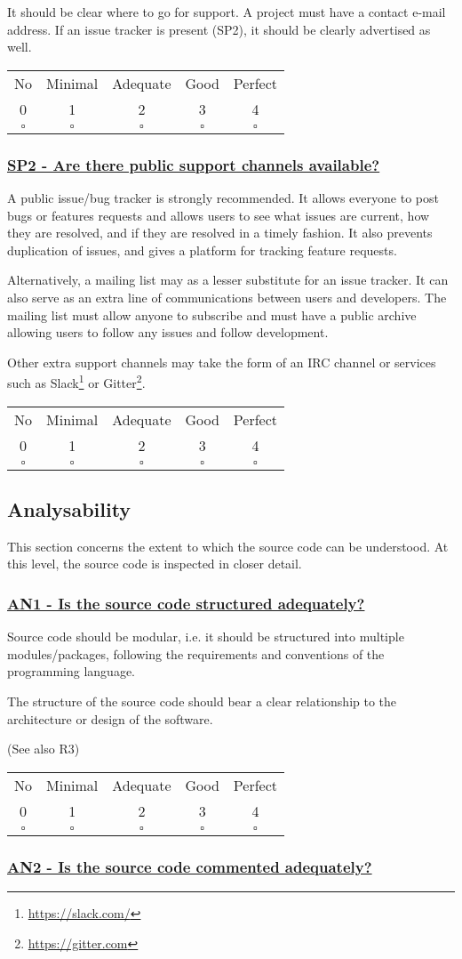 \documentclass[a4paper,11pt]{article}
\newcommand{\criterion}[2]{\subsubsection*{\underline{#1 - #2}}\label{id:#1}}
\newcommand\CheckTable{%
  \begin{tabular}{ccccc}
    No & Minimal & Adequate & Good & Perfect \\
    0 & 1 & 2 & 3 & 4 \\
    \hline
    $\square$ & $\square$ & $\square$ & $\square$ & $\square$ \\
  \end{tabular}%
}
\begin{document}
It should be clear where to go for support. A project must have a contact
e-mail address. If an issue tracker is present (SP2), it should be clearly advertised
as well.

\CheckTable

\newcommand{\spTwoID}{SP2}
\newcommand{\spTwoText}{Are there public support channels available?}
\criterion{\spTwoID}{\spTwoText}

A public issue/bug tracker is strongly recommended. It allows everyone to post
bugs or features requests and allows users to see what issues are current, how
they are resolved, and if they are resolved in a timely fashion. It also
prevents duplication of issues, and gives a platform for
tracking feature requests.

Alternatively, a mailing list may as a lesser substitute for an issue tracker.
It can also serve as an extra line of communications between users
and developers. The mailing list must allow anyone to subscribe and must have a
public archive allowing users to follow any issues and follow development.

Other extra support channels may take the form of an IRC channel or services
such as Slack\footnote{\url{https://slack.com/}} or
Gitter\footnote{\url{https://gitter.com}}.

\CheckTable

\subsection{Analysability}\label{sec:ana}

This section concerns the extent to which the source code can be understood. At
this level, the source code is inspected in closer detail.

\newcommand{\anOneID}{AN1}
\newcommand{\anOneText}{Is the source code structured adequately?}
\criterion{\anOneID}{\anOneText}

Source code should be modular, i.e. it should be structured into multiple
modules/packages, following the requirements and conventions of the programming
language. 

The structure of the source code should bear a clear relationship to the
architecture or design of the software.

(See also R3)

\CheckTable

\newcommand{\anTwoID}{AN2}
\newcommand{\anTwoText}{Is the source code commented adequately?}
\criterion{\anTwoID}{\anTwoText}
\end{document}
